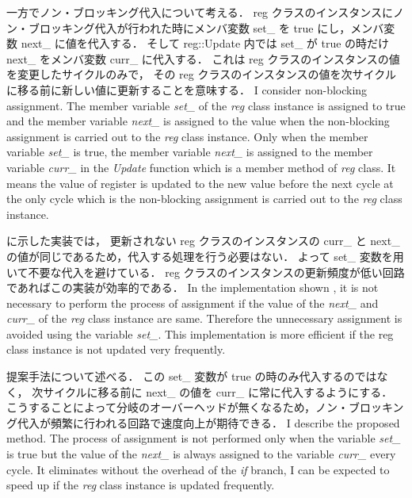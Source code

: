 一方でノン・ブロッキング代入について考える．
reg クラスのインスタンスにノン・ブロッキング代入が行われた時にメンバ変数 set\_ を true にし，メンバ変数 next\_ に値を代入する．
そして reg::Update 内では set\_ が true の時だけ next\_ をメンバ変数 curr\_ に代入する．
これは reg クラスのインスタンスの値を変更したサイクルのみで，
その reg クラスのインスタンスの値を次サイクルに移る前に新しい値に更新することを意味する．
\fi
I consider non-blocking assignment.
The member variable \textit{set\_} of the \textit{reg} class instance is assigned to true
and the member variable \textit{next\_} is assigned to the value
when the non-blocking assignment is carried out to the \textit{reg} class instance.
Only when the member variable \textit{set\_} is true, the member variable \textit{next\_} is assigned to the member variable \textit{curr\_} in the \textit{Update} function which is a member method of \textit{reg} class.
It means the value of register is updated to the new value before the next cycle at the only cycle which is the non-blocking assignment is carried out to the \textit{reg} class instance.

 に示した実装では，
更新されない reg クラスのインスタンスの curr\_ と next\_ の値が同じであるため，代入する処理を行う必要はない．
よって set\_ 変数を用いて不要な代入を避けている．
reg クラスのインスタンスの更新頻度が低い回路であればこの実装が効率的である．
\fi
In the implementation shown ,
it is not necessary to perform the process of assignment
if the value of the \textit{next\_} and \textit{curr\_} of the \textit{reg} class instance are same.
Therefore the unnecessary assignment is avoided using the variable \textit{set\_}.
This implementation is more efficient if the reg class instance is not updated very frequently.

提案手法について述べる．
この set\_ 変数が true の時のみ代入するのではなく，
次サイクルに移る前に next\_ の値を curr\_ に常に代入するようにする．
こうすることによって分岐のオーバーヘッドが無くなるため，ノン・ブロッキング代入が頻繁に行われる回路で速度向上が期待できる．
\fi
I describe the proposed method.
The process of assignment is not performed only when the variable \textit{set\_} is true
but the value of the \textit{next\_} is always assigned to the variable \textit{curr\_} every cycle.
It eliminates without the overhead of the \textit{if} branch,
I can be expected to speed up if the \textit{reg} class instance is updated frequently.


